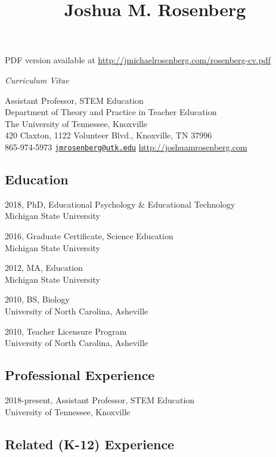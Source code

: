 \documentclass[]{article}
\title{Joshua M. Rosenberg}
\author{}
\date{}
\begin{document}
\maketitle

PDF version available at
\url{http://jmichaelrosenberg.com/rosenberg-cv.pdf}

\emph{Curriculum Vitae}

Assistant Professor, STEM Education\\
Department of Theory and Practice in Teacher Education\\
The University of Tennessee, Knoxville\\
420 Claxton, 1122 Volunteer Blvd., Knoxville, TN 37996\\
865-974-5973 \textbar{}
\href{mailto:jmrosenberg@utk.edu}{\nolinkurl{jmrosenberg@utk.edu}}
\textbar{} \url{http://joshuamrosenberg.com}

\subsection{Education}\label{education}

2018, PhD, Educational Psychology \& Educational Technology\\
Michigan State University

2016, Graduate Certificate, Science Education\\
Michigan State University

2012, MA, Education\\
Michigan State University

2010, BS, Biology\\
University of North Carolina, Asheville

2010, Teacher Licensure Program\\
University of North Carolina, Asheville

\subsection{Professional Experience}\label{professional-experience}

2018-present, Assistant Professor, STEM Education\\
University of Tennessee, Knoxville

\subsection{Related (K-12) Experience}\label{related-k-12-experience}
\end{document}
